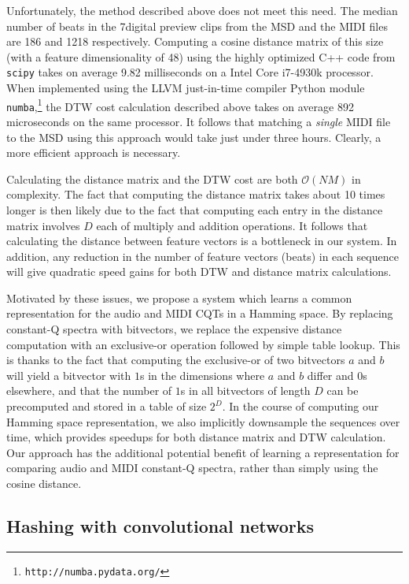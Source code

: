 \documentclass{article}
\begin{document}
Unfortunately, the method described above does not meet this need.
The median number of beats in the 7digital preview clips from the MSD and the MIDI files are 186 and 1218 respectively.
Computing a cosine distance matrix of this size (with a feature dimensionality of 48) using the highly optimized C++ code from \texttt{scipy} \cite{jones2014scipy} takes on average 9.82 milliseconds on a Intel Core i7-4930k processor.
When implemented using the LLVM just-in-time compiler Python module \texttt{numba},\footnote{\texttt{http://numba.pydata.org/}} the DTW cost calculation described above takes on average 892 microseconds on the same processor.
It follows that matching a \textit{single} MIDI file to the MSD using this approach would take just under three hours.
Clearly, a more efficient approach is necessary.

Calculating the distance matrix and the DTW cost are both $\mathcal{O}(NM)$ in complexity.
The fact that computing the distance matrix takes about 10 times longer is then likely due to the fact that computing each entry in the distance matrix involves $D$ each of multiply and addition operations.
It follows that calculating the distance between feature vectors is a bottleneck in our system.
In addition, any reduction in the number of feature vectors (beats) in each sequence will give quadratic speed gains for both DTW and distance matrix calculations.

Motivated by these issues, we propose a system which learns a common representation for the audio and MIDI CQTs in a Hamming space.
By replacing constant-Q spectra with bitvectors, we replace the expensive distance computation with an exclusive-or operation followed by simple table lookup.
This is thanks to the fact that computing the exclusive-or of two bitvectors $a$ and $b$ will yield a bitvector with $1$s in the dimensions where $a$ and $b$ differ and $0$s elsewhere, and that the number of $1$s in all bitvectors of length $D$ can be precomputed and stored in a table of size $2^D$.
In the course of computing our Hamming space representation, we also implicitly downsample the sequences over time, which provides speedups for both distance matrix and DTW calculation.
Our approach has the additional potential benefit of learning a representation for comparing audio and MIDI constant-Q spectra, rather than simply using the cosine distance.

\subsection{Hashing with convolutional networks}
\end{document}

